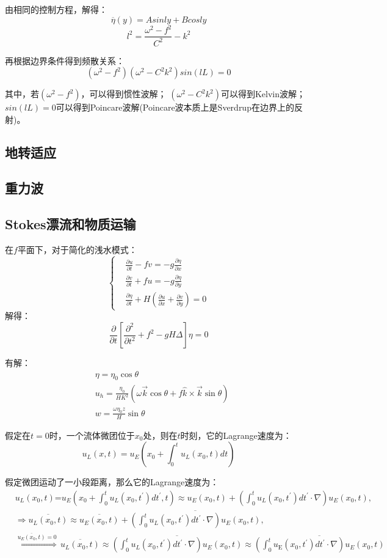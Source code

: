 \documentclass{article}
\begin{document}
由相同的控制方程，解得：
$$\overline{\eta}(y) = Asinly + Bcosly$$
$$l^2 = \frac{\omega^2-f^2}{C^2} - k^2$$

再根据边界条件得到频散关系：
$$(\omega^2-f^2)(\omega^2-C^2k^2)sin(lL) = 0$$

其中，若$(\omega^2-f^2)$，可以得到惯性波解；
$(\omega^2-C^2k^2)$可以得到Kelvin波解；
$sin(lL)=0$可以得到Poincare波解(Poincare波本质上是Sverdrup在边界上的反射)。

\subsection{地转适应}
\subsection{重力波}
\subsection{Stokes漂流和物质运输}
在$f$平面下，对于简化的浅水模式：
$$\begin{cases}
    &\frac{\partial u}{\partial t}-fv=-g\frac{\partial \eta}{\partial x}\\
    &\frac{\partial v}{\partial t}+fu=-g\frac{\partial \eta}{\partial y}\\
    &\frac{\partial \eta}{\partial t}+H(\frac{\partial u}{\partial x}+\frac{\partial v}{\partial y} ) = 0
\end{cases}$$
解得：
$$\frac{\partial }{\partial t}\left[\frac{\partial^2 }{\partial t^2}+f^2-gH\Delta\right]\eta=0 $$

有解：
\begin{align}
    &\eta = \eta_0\cos\theta \\
    &u_h = \frac{\eta_0}{HK^2}(\omega\vec{k}\cos\theta + f\hat{k}\times\vec{k}\sin\theta)\\
    &w = \frac{\omega\eta_0z}{H}\sin\theta
\end{align}

假定在$t=0$时，一个流体微团位于$x_0$处，则在$t$时刻，它的Lagrange速度为：
$$u_L(x,t) = u_E(x_0 + \int_0^t u_L(x_0, t) dt)$$

假定微团运动了一小段距离，那么它的Lagrange速度为：
\begin{align}
  & {{u}_{L}}({{x}_{0}},t)\text{=}{{u}_{E}}({{x}_{0}}+\int_{0}^{t}{{{u}_{L}}({{x}_{0}},t^{\prime})}dt^{\prime},t)\approx {{u}_{E}}({{x}_{0}},t)+(\int_{0}^{t}{{{u}_{L}}({{x}_{0}},t^{\prime})}dt^{\prime}\cdot \nabla ){{u}_{E}}({{x}_{0}},t), \\ 
 & \Rightarrow \overline{{{u}_{L}}({{x}_{0}},t)}\approx \overline{{{u}_{E}}({{x}_{0}},t)}+\overline{(\int_{0}^{t}{{{u}_{L}}({{x}_{0}},t^{\prime})}dt^{\prime}\cdot \nabla ){{u}_{E}}({{x}_{0}},t)}, \\ 
 & \overset{\overline{{{u}_{E}}({{x}_{0}},t)}=0}{\mathop{\Rightarrow }}\,\overline{{{u}_{L}}({{x}_{0}},t)}\approx \overline{(\int_{0}^{t}{{{u}_{L}}({{x}_{0}},t^{\prime})}dt^{\prime}\cdot \nabla ){{u}_{E}}({{x}_{0}},t)}\approx \overline{(\int_{0}^{t}{{{u}_{\text{E}}}({{x}_{0}},t^{\prime})}dt^{\prime}\cdot \nabla ){{u}_{E}}({{x}_{0}},t)}
\end{align}
\end{document}
